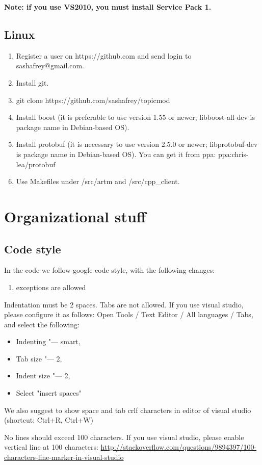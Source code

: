 \documentclass[11pt,a4paper,twoside]{report}
\begin{document}
{\bf Note: if you use VS2010, you must install Service Pack 1.}

\subsection{Linux}

\begin{enumerate}
    \item Register a user on https://github.com and send login to sashafrey@gmail.com.
    \item Install git.
    \item git clone https://github.com/sashafrey/topicmod
    \item Install boost (it is preferable to use version 1.55 or newer; \hbox{libboost-all-dev} is package name in Debian-based OS).
    \item Install protobuf (it is necessary to use version 2.5.0 or newer; \hbox{libprotobuf-dev} is package name in Debian-based OS). You can get it from ppa: \hbox{ppa:chris-lea/protobuf}
    \item Use Makefiles under /src/artm and /src/cpp\_client.
\end{enumerate}

\section{Organizational stuff}

\subsection{Code style}
In the code we follow google code style, with the following changes:
\begin{enumerate}
    \item exceptions are allowed
\end{enumerate}

\item Indentation must be 2 spaces. Tabs are not allowed.
      If you use visual studio, please configure it as follows:
      Open Tools / Text Editor / All languages / Tabs, and select the following:
      \begin{itemize}
          \item Indenting "--- smart,
          \item Tab size "--- 2,
          \item Indent size "--- 2,
          \item Select "insert spaces"
      \end{itemize}
   We also suggest to show space and tab crlf characters in editor of visual studio (shortcut: Ctrl+R, Ctrl+W)
\item No lines should exceed 100 characters.
      If you use visual studio, please enable vertical line at 100 characters:
      \url{http://stackoverflow.com/questions/9894397/100-characters-line-marker-in-visual-studio}
\end{document}
